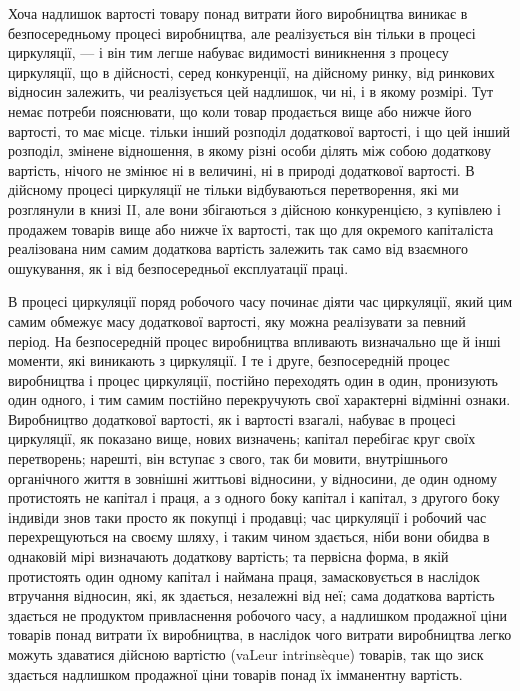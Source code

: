 Хоча надлишок вартості товару понад витрати його виробництва
виникає в безпосередньому процесі виробництва, але реалізується
він тільки в процесі циркуляції, — і він тим легше набуває видимості
виникнення з процесу циркуляції, що в дійсності, серед
конкуренції, на дійсному ринку, від ринкових відносин залежить,
чи реалізується цей надлишок, чи ні, і в якому розмірі. Тут
немає потреби пояснювати, що коли товар продається вище
або нижче його вартості, то має місце. тільки інший розподіл
додаткової вартості, і що цей інший розподіл, змінене
відношення, в якому різні особи ділять між собою додаткову вартість,
нічого не змінює ні в величині, ні в природі додаткової
вартості. В дійсному процесі циркуляції не тільки відбуваються
перетворення, які ми розглянули в книзі II, але вони збігаються
з дійсною конкуренцією, з купівлею і продажем товарів вище
або нижче їх вартості, так що для окремого капіталіста реалізована
ним самим додаткова вартість залежить так само від
взаємного ошукування, як і від безпосередньої експлуатації
праці.

В процесі циркуляції поряд робочого часу починає діяти час
циркуляції, який цим самим обмежує масу додаткової вартості,
яку можна реалізувати за певний період. На безпосередній
процес виробництва впливають визначально ще й інші моменти,
які виникають з циркуляції. І те і друге, безпосередній
процес виробництва і процес циркуляції, постійно переходять
один в один, пронизують один одного, і тим самим постійно
перекручують свої характерні відмінні ознаки. Виробництво додаткової
вартості, як і вартості взагалі, набуває в процесі циркуляції,
як показано вище, нових визначень; капітал перебігає
круг своїх перетворень; нарешті, він вступає з свого, так би
мовити, внутрішнього органічного життя в зовнішні життьові
відносини, у відносини, де один одному протистоять не капітал
і праця, а з одного боку капітал і капітал, з другого боку
індивіди знов таки просто як покупці і продавці; час циркуляції
і робочий час перехрещуються на своєму шляху, і таким
чином здається, ніби вони обидва в однаковій мірі визначають
додаткову вартість; та первісна форма, в якій протистоять один
одному капітал і наймана праця, замасковується в наслідок втручання
відносин, які, як здається, незалежні від неї; сама додаткова
вартість здається не продуктом привласнення робочого часу,
а надлишком продажної ціни товарів понад витрати їх виробництва,
в наслідок чого витрати виробництва легко можуть здаватися
дійсною вартістю (vaLeur intrinsèque) товарів, так що зиск
здається надлишком продажної ціни товарів понад їх імманентну
вартість.

